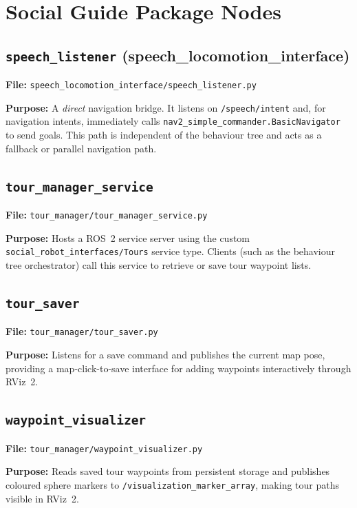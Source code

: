 \documentclass[12pt,a4paper]{report}
\newcommand{\topic}[1]{\texttt{\color{purple!80!black}#1}}
\newcommand{\file}[1]{\texttt{\color{black!70}#1}}
\newcommand{\node}[1]{\texttt{\color{Maroon}#1}}
\begin{document}
\section{Social Guide Package Nodes}

\subsection{\node{speech\_listener} (speech\_locomotion\_interface)}
\label{sub:sl}

\textbf{File:} \file{speech\_locomotion\_interface/speech\_listener.py}

\textbf{Purpose:} A \emph{direct} navigation bridge.  It listens on
\topic{/speech/intent} and, for navigation intents, immediately calls
\texttt{nav2\_simple\_commander.BasicNavigator} to send goals.  This path is
independent of the behaviour tree and acts as a fallback or parallel navigation
path.

\subsection{\node{tour\_manager\_service}}
\label{sub:tms}

\textbf{File:} \file{tour\_manager/tour\_manager\_service.py}

\textbf{Purpose:} Hosts a ROS~2 service server using the custom
\texttt{social\_robot\_interfaces/Tours} service type.  Clients (such as the
behaviour tree orchestrator) call this service to retrieve or save tour
waypoint lists.

\subsection{\node{tour\_saver}}
\label{sub:tsaver}

\textbf{File:} \file{tour\_manager/tour\_saver.py}

\textbf{Purpose:} Listens for a save command and publishes the current map
pose, providing a map-click-to-save interface for adding waypoints interactively
through RViz~2.

\subsection{\node{waypoint\_visualizer}}
\label{sub:wv}

\textbf{File:} \file{tour\_manager/waypoint\_visualizer.py}

\textbf{Purpose:} Reads saved tour waypoints from persistent storage and
publishes coloured sphere markers to \topic{/visualization\_marker\_array},
making tour paths visible in RViz~2.
\end{document}
